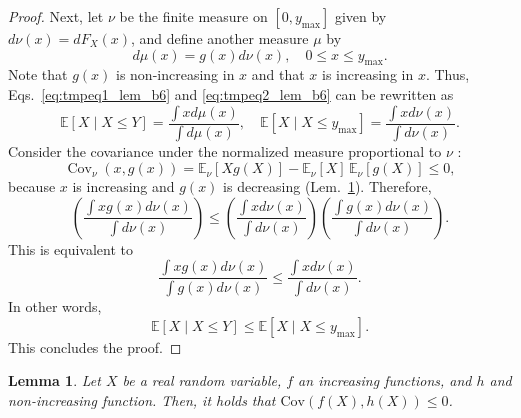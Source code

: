\documentclass{article}
\theoremstyle{plain}
\newtheorem{lemma}[theorem]{Lemma}
\theoremstyle{definition}
\theoremstyle{remark}
\begin{document}
\begin{proof}
    Next, let $\nu$ be the finite measure on $\left[0, y_{\mathrm{max}} \right]$ given by $d \nu(x)=d F_X(x)$, and define another measure $\mu$ by
    \begin{equation}
       d \mu(x)=g(x) d \nu(x), \quad 0 \leq x \leq y_{\mathrm{max}} .
    \end{equation}
    Note that $g(x)$ is non-increasing in $x$ and that $x$ is increasing in $x$.
    Thus, Eqs.~\eqref{eq:tmpeq1_lem_b6} and \eqref{eq:tmpeq2_lem_b6} can be rewritten as
    \begin{equation}
      \mathbb{E}[X \mid X \leq Y]=\frac{\int x d \mu(x)}{\int d \mu(x)}, \quad \mathbb{E}\left[X \mid X \leq y_{\mathrm{max}}\right]=\frac{\int x d \nu(x)}{\int d \nu(x)} .
    \end{equation}
    Consider the covariance under the normalized measure proportional to $\nu$ :
    \begin{equation}
        \operatorname{Cov}_\nu(x, g(x)) = \mathbb{E}_{\nu} [X g(X)] - \mathbb{E}_{\nu} [X] \, \mathbb{E}_{\nu} [g(X)] \leq 0 ,
    \end{equation}
    because $x$ is increasing and $g(x)$ is decreasing (Lem.~\ref{lem:negative_covariant}). 
    Therefore,
    \begin{equation}
      (\frac{\int x g(x) d \nu(x)}{\int d \nu(x)}) \leq ( \frac{\int x d \nu(x)}{\int d \nu(x)} ) (\frac{\int g(x) d \nu(x)}{\int d \nu(x)})  .
    \end{equation}
    This is equivalent to
    \begin{equation}
       \frac{\int x g(x) d \nu(x)}{\int g(x) d \nu(x)} \leq \frac{\int x d \nu(x)}{\int d \nu(x)}.
    \end{equation}
    In other words,
    \begin{equation}
        \mathbb{E}[X \mid X \leq Y] \leq \mathbb{E}\left[X \mid X \leq y_{\mathrm{max}}\right].
    \end{equation}
    This concludes the proof.
\end{proof}

\begin{lemma} \label{lem:negative_covariant}
    Let $X$ be a real random variable, $f$ an increasing functions, and $h$ and non-increasing function. Then, it holds that 
    $\mathrm{Cov}(f(X), h(X)) \leq 0$.
\end{lemma}
\end{document}
